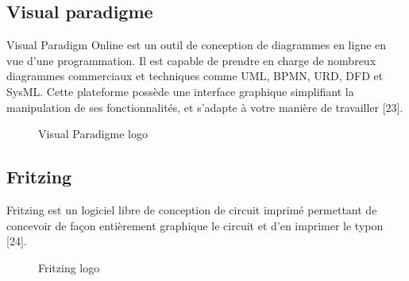 \subsection{Visual paradigme}
Visual Paradigm Online est un outil de conception de diagrammes en ligne en vue d’une programmation. Il est capable de prendre en charge de nombreux diagrammes commerciaux et techniques comme UML, BPMN, URD, DFD et SysML. Cette plateforme possède une interface graphique simplifiant la manipulation de ses fonctionnalités, et s’adapte à votre manière de travailler [23].

\begin{figure}[hbt]
\centering
\right
\label{fig:Visual paradigme LOGO}

  \caption{Visual Paradigme logo}
\end{figure}


\subsection{Fritzing}
Fritzing est un logiciel libre de conception de circuit imprimé permettant de concevoir de façon entièrement graphique le circuit et d'en imprimer le typon 
[24].

\begin{figure}[hbt]
\centering
\right
\label{fig: Fritzing LOGO}

  \caption{Fritzing logo}
\end{figure}

